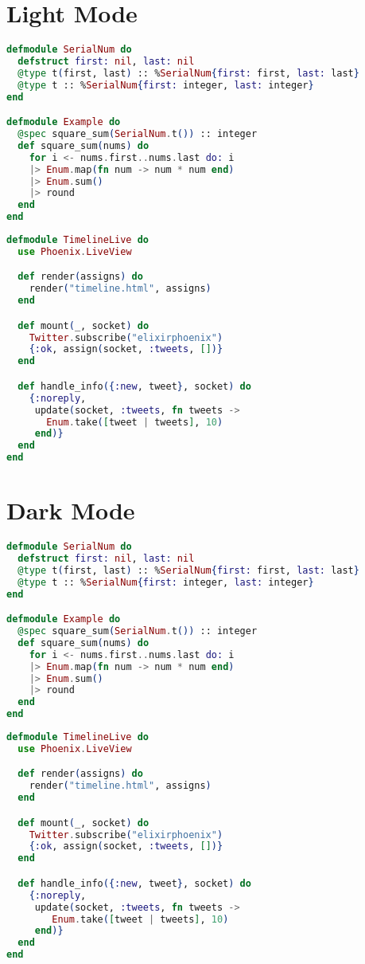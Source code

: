 \documentclass[dvipdfmx,uplatex,a4paper]{article}
\begin{document}
\section*{Light Mode}
\begin{lstlisting}[language=elixir,style=light]
defmodule SerialNum do
  defstruct first: nil, last: nil
  @type t(first, last) :: %SerialNum{first: first, last: last}
  @type t :: %SerialNum{first: integer, last: integer}
end

defmodule Example do
  @spec square_sum(SerialNum.t()) :: integer
  def square_sum(nums) do
    for i <- nums.first..nums.last do: i
    |> Enum.map(fn num -> num * num end)
    |> Enum.sum()
    |> round
  end
end
\end{lstlisting}

\begin{lstlisting}[language=elixir,style=light]
defmodule TimelineLive do
  use Phoenix.LiveView

  def render(assigns) do
    render("timeline.html", assigns)
  end

  def mount(_, socket) do
    Twitter.subscribe("elixirphoenix")
    {:ok, assign(socket, :tweets, [])}
  end

  def handle_info({:new, tweet}, socket) do
    {:noreply,
     update(socket, :tweets, fn tweets ->
       Enum.take([tweet | tweets], 10)
     end)}
  end
end
\end{lstlisting}

\newpage

\section*{Dark Mode}
\begin{lstlisting}[language=elixir,style=dark]
defmodule SerialNum do
  defstruct first: nil, last: nil
  @type t(first, last) :: %SerialNum{first: first, last: last}
  @type t :: %SerialNum{first: integer, last: integer}
end

defmodule Example do
  @spec square_sum(SerialNum.t()) :: integer
  def square_sum(nums) do
    for i <- nums.first..nums.last do: i
    |> Enum.map(fn num -> num * num end)
    |> Enum.sum()
    |> round
  end
end
\end{lstlisting}

\begin{lstlisting}[language=elixir,style=dark]
defmodule TimelineLive do
  use Phoenix.LiveView

  def render(assigns) do
    render("timeline.html", assigns)
  end

  def mount(_, socket) do
    Twitter.subscribe("elixirphoenix")
    {:ok, assign(socket, :tweets, [])}
  end

  def handle_info({:new, tweet}, socket) do
    {:noreply,
     update(socket, :tweets, fn tweets ->
        Enum.take([tweet | tweets], 10)
     end)}
  end
end
\end{lstlisting}
\end{document}
